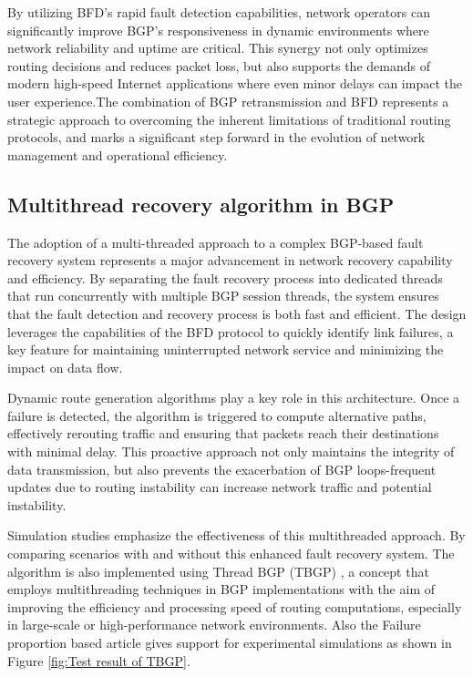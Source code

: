 \documentclass[12pt]{article}
\begin{document}
By utilizing BFD's rapid fault detection capabilities, network operators can significantly improve BGP's responsiveness in dynamic environments where network reliability and uptime are critical. This synergy not only optimizes routing decisions and reduces packet loss, but also supports the demands of modern high-speed Internet applications where even minor delays can impact the user experience.The combination of BGP retransmission and BFD represents a strategic approach to overcoming the inherent limitations of traditional routing protocols, and marks a significant step forward in the evolution of network management and operational efficiency.

\subsection{Multithread recovery algorithm in BGP}
The adoption of a multi-threaded approach to a complex BGP-based fault recovery system represents a major advancement in network recovery capability and efficiency. By separating the fault recovery process into dedicated threads that run concurrently with multiple BGP session threads, the system ensures that the fault detection and recovery process is both fast and efficient. The design leverages the capabilities of the BFD protocol to quickly identify link failures, a key feature for maintaining uninterrupted network service and minimizing the impact on data flow.

Dynamic route generation algorithms play a key role in this architecture. Once a failure is detected, the algorithm is triggered to compute alternative paths, effectively rerouting traffic and ensuring that packets reach their destinations with minimal delay. This proactive approach not only maintains the integrity of data transmission, but also prevents the exacerbation of BGP loops-frequent updates due to routing instability can increase network traffic and potential instability.

Simulation studies emphasize the effectiveness of this multithreaded approach. By comparing scenarios with and without this enhanced fault recovery system. The algorithm is also implemented using Thread BGP (TBGP) \cite{ref8}, a concept that employs multithreading techniques in BGP implementations with the aim of improving the efficiency and processing speed of routing computations, especially in large-scale or high-performance network environments. Also the Failure proportion based article gives support for experimental simulations as shown in Figure \ref{fig:Test result of TBGP}.
\end{document}
